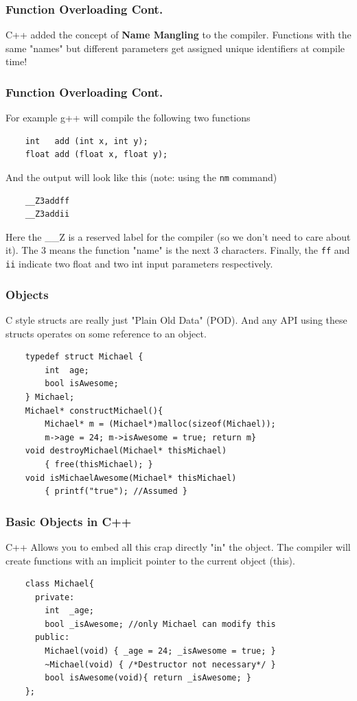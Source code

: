 \documentclass{beamer}
\begin{document}
\begin{frame}[fragile]
    \frametitle{Function Overloading Cont.}

    C++ added the concept of \textbf{Name Mangling} to the compiler.
    Functions with the same "names" but different parameters get assigned unique identifiers at compile time!
\end{frame}    
\begin{frame}[fragile]
    \frametitle{Function Overloading Cont.}
    For example g++ will compile the following two functions

    \begin{verbatim}
    int   add (int x, int y);
    float add (float x, float y); 
    \end{verbatim}
    And the output will look like this (note: using the \texttt{nm} command)
    \begin{verbatim}
    __Z3addff
    __Z3addii
    \end{verbatim}
    Here the \_\_Z is a reserved label for the compiler (so we don't need to care about it). 
    The 3 means the function "name" is the next 3 characters. Finally, the \texttt{ff} and \texttt{ii} indicate two float and two int input parameters respectively.

\end{frame}


\begin{frame}[fragile]
    \frametitle{Objects}
    C style structs are really just "Plain Old Data" (POD).
    And any API using these structs operates on some reference to an object.

    \begin{verbatim}
    typedef struct Michael {
        int  age;
        bool isAwesome;
    } Michael;
    Michael* constructMichael(){ 
        Michael* m = (Michael*)malloc(sizeof(Michael)); 
        m->age = 24; m->isAwesome = true; return m}
    void destroyMichael(Michael* thisMichael)
        { free(thisMichael); }
    void isMichaelAwesome(Michael* thisMichael)
        { printf("true"); //Assumed }
    \end{verbatim}


\end{frame}

\begin{frame}[fragile]
    \frametitle{Basic Objects in C++}
    C++ Allows you to embed all this crap directly "in" the object. The compiler will create functions with an implicit pointer to the current object (this).

    \begin{verbatim}
    class Michael{
      private:
        int  _age;
        bool _isAwesome; //only Michael can modify this
      public:
        Michael(void) { _age = 24; _isAwesome = true; }
        ~Michael(void) { /*Destructor not necessary*/ }
        bool isAwesome(void){ return _isAwesome; }
    };
    \end{verbatim}
\end{frame}
\end{document}
